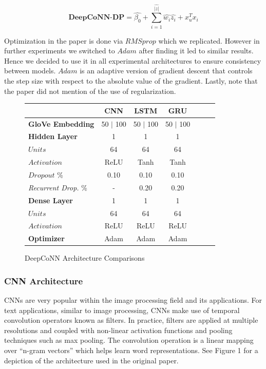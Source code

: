 \documentclass[10pt,twocolumn,letterpaper]{article}
\begin{document}
$$
\textbf{DeepCoNN-DP} = \hat{\beta_{0}} + \sum_{i=1}^{\hat{|z|}}\hat{w_{i}}\hat{z_{i}} + x^{T}_{u}x_{i}
$$

Optimization in the paper is done via $RMSprop$ which we replicated. However in further experiments we switched to $Adam$ after finding it led to similar results. Hence we decided to use it in all experimental architectures to ensure consistency between models. $Adam$ is an adaptive version of gradient descent that controls the step size with respect to the absolute value of the gradient. Lastly, note that the paper did not mention of the use of regularization.

\begin{figure}[!ht]
\begin{center}
{\small
\begin{tabular}{l|cccccc}
\hline
					 & \textbf{CNN} & \textbf{LSTM} & \textbf{GRU}  \\
\hline
\textbf{GloVe Embedding} & 50 $|$ 100 & 50 $|$ 100 & 50 $|$ 100 \\
\hline
\textbf{Hidden Layer} & 1 & 1 & 1 \\
$Units$ & 64 & 64 & 64 \\
$Activation$ & ReLU & Tanh &  Tanh \\
$Dropout$ \% & 0.10 & 0.10 & 0.10 & \\
\textit{Recurrent Drop.} \% & \-- & 0.20 & 0.20 & \\
\hline
\textbf{Dense Layer} & 1 & 1 & 1 \\
$Units$ & 64 & 64 &  64 \\
$Activation$ & ReLU & ReLU &  ReLU \\
\hline
\textbf{Optimizer} & Adam & Adam &  Adam \\
\hline

\end{tabular}
}
\end{center}
\caption{DeepCoNN Architecture Comparisons}
\end{figure}

\subsubsection{CNN Architecture}
CNNs are very popular within the image processing field and its applications.
For text applications, similar to image processing, CNNs make use of temporal convolution operators known as filters. In practice, filters are applied at multiple resolutions and coupled with non-linear activation functions
and pooling techniques such as max pooling. The convolution operation is a linear mapping over “n-gram vectors” which helps learn word representations. See Figure 1 for a depiction of the architecture used in the original paper.
\end{document}
